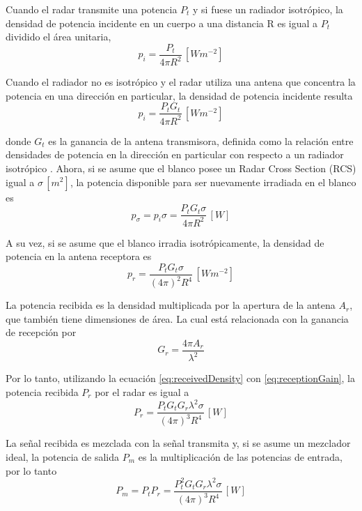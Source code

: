 Cuando el radar transmite una potencia $P_t$ y si fuese un radiador isotrópico, la densidad de potencia incidente en un cuerpo a una distancia R es igual a $P_t$ dividido el área unitaria,
\begin{equation}
  p_i = \dfrac{P_t}{4\pi R^2} \,[\si{Wm^{-2}}]
\end{equation}

Cuando el radiador no es isotrópico y el radar utiliza una antena que concentra la potencia en una dirección en particular, la densidad de potencia incidente resulta
\begin{equation}
  p_i = \dfrac{P_tG_t}{4\pi R^2} \,[\si{Wm^{-2}}]
\end{equation}

donde $G_t$ es la ganancia de la antena transmisora, definida como la relación entre densidades de potencia en la dirección en particular con respecto a un radiador isotrópico \cite{Richards2009}. Ahora, si se asume que el blanco posee un Radar Cross Section (RCS) igual a $\sigma \,[\si{m^2}]$, la potencia disponible para ser nuevamente irradiada en el blanco es 
\begin{equation}
  p_\sigma = p_i\sigma = \dfrac{P_tG_t\sigma}{4\pi R^2} \,[\si{W}]
\end{equation}

A su vez, si se asume que el blanco irradia isotrópicamente, la densidad de potencia en la antena receptora es 
\begin{equation} \label{eq:receivedDensity}
  p_r = \dfrac{P_tG_t\sigma}{(4\pi)^2 R^4} \,[\si{Wm^{-2}}]
\end{equation}

La potencia recibida es la densidad multiplicada por la apertura de la antena $A_r$, que también tiene dimensiones de área. La cual está relacionada con la ganancia de recepción por 
\begin{equation} \label{eq:receptionGain}
  G_r = \dfrac{4\pi A_r}{\lambda^2}
\end{equation}

Por lo tanto, utilizando la ecuación \ref{eq:receivedDensity} con \ref{eq:receptionGain}, la potencia recibida $P_r$ por el radar es igual a
\begin{equation}
  P_r = \dfrac{P_tG_tG_r\lambda^2\sigma}{(4\pi)^3 R^4} \,[\si{W}]
\end{equation}

La señal recibida es mezclada con la señal transmita y, si se asume un mezclador ideal, la potencia de salida $P_m$ es la multiplicación de las potencias de entrada, por lo tanto
\begin{equation}
  P_m = P_tP_r = \dfrac{P_t^2G_tG_r\lambda^2\sigma}{(4\pi)^3 R^4} \,[\si{W}]
\end{equation}

